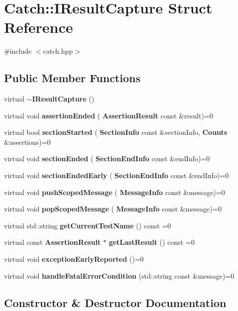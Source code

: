\section{Catch\+:\+:I\+Result\+Capture Struct Reference}
\label{struct_catch_1_1_i_result_capture}


{\ttfamily \#include $<$catch.\+hpp$>$}

\subsection*{Public Member Functions}
\begin{DoxyCompactItemize}
\item 
virtual \textbf{ $\sim$\+I\+Result\+Capture} ()
\item 
virtual void \textbf{ assertion\+Ended} (\textbf{ Assertion\+Result} const \&result)=0
\item 
virtual bool \textbf{ section\+Started} (\textbf{ Section\+Info} const \&section\+Info, \textbf{ Counts} \&assertions)=0
\item 
virtual void \textbf{ section\+Ended} (\textbf{ Section\+End\+Info} const \&end\+Info)=0
\item 
virtual void \textbf{ section\+Ended\+Early} (\textbf{ Section\+End\+Info} const \&end\+Info)=0
\item 
virtual void \textbf{ push\+Scoped\+Message} (\textbf{ Message\+Info} const \&message)=0
\item 
virtual void \textbf{ pop\+Scoped\+Message} (\textbf{ Message\+Info} const \&message)=0
\item 
virtual std\+::string \textbf{ get\+Current\+Test\+Name} () const =0
\item 
virtual const \textbf{ Assertion\+Result} $\ast$ \textbf{ get\+Last\+Result} () const =0
\item 
virtual void \textbf{ exception\+Early\+Reported} ()=0
\item 
virtual void \textbf{ handle\+Fatal\+Error\+Condition} (std\+::string const \&message)=0
\end{DoxyCompactItemize}


\subsection{Constructor \& Destructor Documentation}
\mbox{\label{struct_catch_1_1_i_result_capture_a3bd16719d6772b7470887fc36c6d0808}} 
